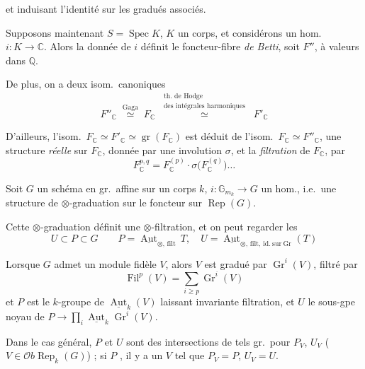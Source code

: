 \documentclass[11pt,a4paper]{article}
\begin{document}
et induisant l'identité sur les gradués associés.

Supposons maintenant $S = \operatorname{Spec} K$, $K$ un corps, et
considérons un hom.\ $i : K \to \mathbb{C}$. Alors la donnée de $i$ définit le
foncteur-fibre \emph{de Betti}, soit $F''$, à valeurs dans $\mathbb{Q}$.

De plus, on a  deux isom.\ canoniques
\[
F''_{\mathbb{C}} \;\overset{\text{Gaga}}{\simeq}\; F_{\mathbb{C}}
\;\overset{\substack{\text{th. de Hodge}\\ \text{des intégrales harmoniques}}}
{\simeq}\; F'_{\mathbb{C}}
\]

D'ailleurs, l'isom.\ $F_{\mathbb{C}} \simeq F'_{\mathbb{C}} \simeq
\operatorname{gr}(F_{\mathbb{C}})$ est déduit de l'isom.\ $F_{\mathbb{C}} \simeq F''_{\mathbb{C}}$,  une structure
\emph{réelle} sur $F_{\mathbb{C}}$, donnée par une involution $\sigma$, et la
\emph{filtration}  de $F_{\mathbb{C}}$, par
\[
F^{p,q}_{\mathbb{C}} = F^{(p)}_{\mathbb{C}} \cdot
\sigma\bigl( F^{(q)}_{\mathbb{C}} \bigr) \dots
\]

Soit $G$ un schéma en gr.\ affine sur un corps $k$,
$i : \mathbb{G}_{m_{k}} \longrightarrow G$ un hom., i.e.\ une structure de
$\otimes$-graduation sur le foncteur  sur
$\operatorname{Rep}(G)$.

Cette $\otimes$-graduation définit une $\otimes$-filtration, et on peut
regarder les 
\[
U \subset P \subset G \qquad
P = \underline{\operatorname{Aut}}_{\otimes,\,\mathrm{filt}}\, T , \quad
U = \underline{\operatorname{Aut}}_{\otimes,\,\mathrm{filt},\,
\mathrm{id.\ sur\ Gr}}(T)
\]

Lorsque $G$  admet un module
fidèle $V$, \struck{\ill{}} alors $V$ est gradué par
$\operatorname{Gr}^{i}(V)$, filtré par
\[
\operatorname{Fil}^{p}(V) = \sum_{i \geq p} \operatorname{Gr}^{i}(V)
\]
et $P$ \struck{\ill{}} est le $k$-groupe de
$\underline{\operatorname{Aut}}_{k}(V)$ laissant invariante 
filtration, et $U$ le sous-gpe noyau de
$P \to \prod_{i} \underline{\operatorname{Aut}}_{k}
\operatorname{Gr}^{i}(V)$.

Dans le cas général, $P$ et $U$ sont des intersections de tels gr.\ pour
$P_{V}$, $U_{V}$ ($V \in \mathcal{O}b \operatorname{Rep}_{k}(G)$) ; si $P$
\ill{}, il y a un $V$ tel que $P_{V} = P$, $U_{V} = U$.
\end{document}
